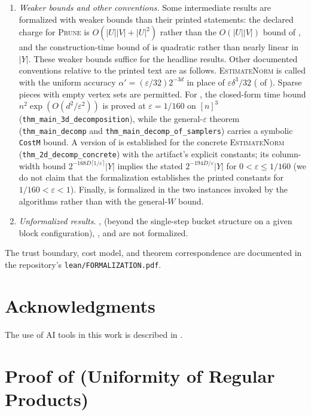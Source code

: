 \documentclass[11pt]{article}
\theoremstyle{definition}
\renewcommand{\label}[1]{}%
\newcommand{\abs}[1]{\left\lvert #1 \right\rvert}
\newcommand{\Prune}{\textnormal{\textsc{Prune}}}
\newcommand{\EstimateNorm}{\textnormal{\textsc{EstimateNorm}}}
\begin{document}
\begin{enumerate}[label=(\roman*), leftmargin=*]
    \item \emph{Weaker bounds and other conventions.} Some intermediate results are formalized with weaker bounds than their printed statements: the declared charge for \Prune{} is $O(\abs{U}\abs{V}+\abs{U}^2)$ rather than the $O(\abs{U}\abs{V})$ bound of , and the construction-time bound of  is quadratic rather than nearly linear in $\abs{Y}$. These weaker bounds suffice for the headline results. Other documented conventions relative to the printed text are as follows. \EstimateNorm{} is called with the uniform accuracy $\alpha' = (\varepsilon/32)2^{-3d}$ in place of $\varepsilon\delta^3/32$ ( of ). Sparse pieces with empty vertex sets are permitted. For , the closed-form time bound $n^2\exp(O(d^2/\varepsilon^2))$ is proved at $\varepsilon = 1/160$ on $[n]^3$ (\texttt{thm\_main\_3d\_decomposition}), while the general-$\varepsilon$ theorem (\texttt{thm\_main\_decomp} and \texttt{thm\_main\_decomp\_of\_samplers}) carries a symbolic \texttt{CostM} bound. A version of  is established for the concrete \EstimateNorm{} (\texttt{thm\_2d\_decomp\_concrete}) with the artifact's explicit constants; its column-width bound $2^{-168D\lceil 1/\varepsilon\rceil}|Y|$ implies the stated $2^{-194D/\varepsilon}|Y|$ for $0 < \varepsilon \le 1/160$ (we do not claim that the formalization establishes the printed constants for $1/160 < \varepsilon < 1$). Finally,  is formalized in the two instances invoked by the algorithms rather than with the general-$W$ bound.
    \item \emph{Unformalized results.} ,  (beyond the single-step bucket structure on a given block configuration), , and  are not formalized.
\end{enumerate}
The trust boundary, cost model, and theorem correspondence are documented in the repository's \texttt{lean/FORMALIZATION.pdf}.

\section*{Acknowledgments}
The use of AI tools in this work is described in .

\appendix
{}

\section{Proof of \texorpdfstring{}{Proposition 3.1} (Uniformity of Regular Products)}
\label{app:klm-proof}
\end{document}
